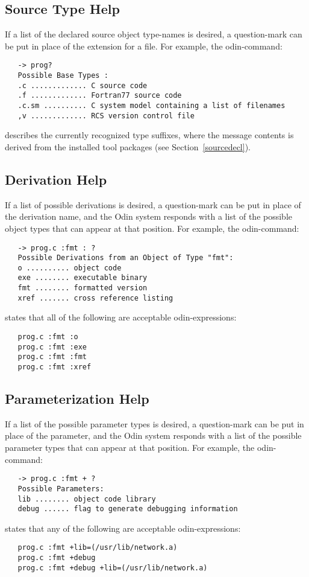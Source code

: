 \subsection{Source Type Help}

If a list of the declared source object type-names is desired,
a question-mark can be put in place of the extension for a file.
For example, the odin-command:
\begin{verbatim}
   -> prog?
   Possible Base Types :
   .c ............. C source code
   .f ............. Fortran77 source code
   .c.sm .......... C system model containing a list of filenames
   ,v ............. RCS version control file
\end{verbatim}
describes the currently recognized type suffixes,
where the message contents is derived from the installed tool packages
(see Section~\ref{sourcedecl}).

\subsection{Derivation Help}

If a list of possible derivations is desired,
a question-mark can be put in place of the derivation name,
and the Odin system responds with a list of the
possible object types that can appear at that position.
For example, the odin-command:
\begin{verbatim}
   -> prog.c :fmt : ?
   Possible Derivations from an Object of Type "fmt":
   o .......... object code
   exe ........ executable binary
   fmt ........ formatted version
   xref ....... cross reference listing
\end{verbatim}
states that all of the following are acceptable odin-expressions:
\begin{verbatim}
   prog.c :fmt :o
   prog.c :fmt :exe
   prog.c :fmt :fmt
   prog.c :fmt :xref
\end{verbatim}

\subsection{Parameterization Help}

If a list of the possible parameter types is desired,
a question-mark can be put in place of the parameter,
and the Odin system responds with a list of the possible
parameter types that can appear at that position.
For example, the odin-command:
\begin{verbatim}
   -> prog.c :fmt + ?
   Possible Parameters:
   lib ........ object code library
   debug ...... flag to generate debugging information
\end{verbatim}
states that any of the following are acceptable odin-expressions:
\begin{verbatim}
   prog.c :fmt +lib=(/usr/lib/network.a)
   prog.c :fmt +debug
   prog.c :fmt +debug +lib=(/usr/lib/network.a)
\end{verbatim}

